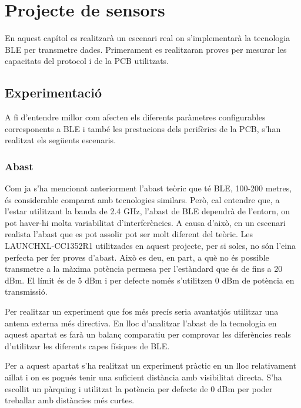 \chapter{Projecte de sensors}
En aquest capítol es realitzarà un escenari real on s'implementarà la tecnologia BLE per transmetre dades.
Primerament es realitzaran proves per mesurar les capacitats del protocol i de la PCB utilitzats.

\section{Experimentació}
A fi d'entendre millor com afecten els diferents paràmetres configurables corresponents a BLE i també les prestacions dels perifèrics de la PCB, s'han realitzat els següents escenaris.


\subsection{Abast}

Com ja s'ha mencionat anteriorment l'abast teòric que té BLE, 100-200 metres, és considerable comparat amb tecnologies similars.
Però, cal entendre que, a l'estar utilitzant la banda de 2.4 GHz, l'abast de BLE dependrà de l'entorn, on pot haver-hi molta variabilitat d'interferències.
A causa d'això, en un escenari realista l'abast que es pot assolir pot ser molt diferent del teòric.
Les LAUNCHXL-CC1352R1 utilitzades en aquest projecte, per si soles, no són l'eina perfecta per fer proves d'abast.
Això es deu, en part, a què no és possible transmetre a la màxima potència permesa per l'estàndard que és de fins a 20 dBm.
El límit és de 5 dBm i per defecte només s'utilitzen 0 dBm de potència en transmissió.

Per realitzar un experiment que fos més precís seria avantatjós utilitzar una antena externa més directiva.
En lloc d'analitzar l'abast de la tecnologia en aquest apartat es farà un balanç comparatiu per comprovar les diferències reals d'utilitzar les diferents capes físiques de BLE.

Per a aquest apartat s'ha realitzat un experiment pràctic en un lloc relativament aïllat i on es pogués tenir una suficient distància amb visibilitat directa.
S'ha escollit un pàrquing i utilitzat la potència per defecte de 0 dBm per poder treballar amb distàncies més curtes.

